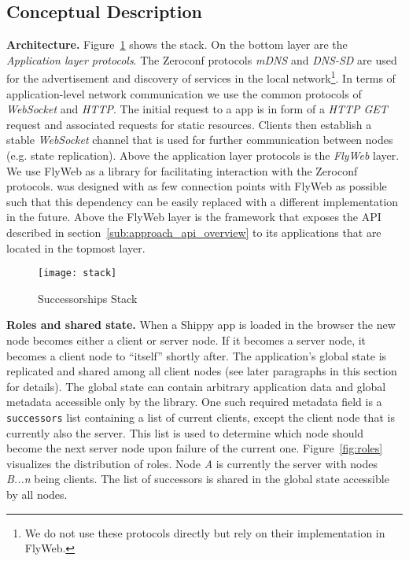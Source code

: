 \subsection{Conceptual Description}
\label{sub:approach_conceptual_description}

\textbf{Architecture.} 
Figure~\ref{fig:stack} shows the \APIName stack.
On the bottom layer are the \textit{Application layer protocols}.
The Zeroconf protocols \textit{mDNS} and \textit{DNS-SD} are used for the advertisement and discovery of \APIshort services in the local network\footnote{We do not use these protocols directly but rely on their implementation in FlyWeb.}. 
In terms of application-level network communication we use the common protocols of \textit{WebSocket} and \textit{HTTP}. 
The initial request to a \APIshort app is in form of a \textit{HTTP GET} request and associated requests for static resources.  Clients then establish a stable \textit{WebSocket} channel that is used for further communication between nodes (e.g. state replication). 
Above the application layer protocols is the \textit{FlyWeb} layer. 
We use FlyWeb as a library for facilitating interaction with the Zeroconf protocols. 
\APIName was designed with as few connection points with FlyWeb as possible such that this dependency can be easily replaced with a different implementation in the future. 
Above the FlyWeb layer is the \textit{\APIName} framework that exposes the API described in section~\ref{sub:approach_api_overview} to its applications that are located in the topmost layer.

\begin{figure}[h]
    \centering
    \texttt{[image: stack]}
    \caption{Successorships Stack}
    \label{fig:stack}
\end{figure}

\noindent\textbf{Roles and shared state.} When a Shippy app is loaded in the browser the new node becomes either a client or server node. If it becomes a server node, it becomes a client node to ``itself'' shortly after. The application's global state is replicated and shared among all client nodes (see later paragraphs in this section for details). The global state can contain arbitrary application data and global metadata accessible only by the \APIshort library. One such required metadata field is a \texttt{successors} list containing a list of current clients, except the client node that is currently also the server. This list is used to determine which node should become the next server node upon failure of the current one. Figure~\ref{fig:roles} visualizes the distribution of roles. Node \textit{A} is currently the server with nodes \textit{B...n} being clients. The list of successors is shared in the global state accessible by all nodes.

